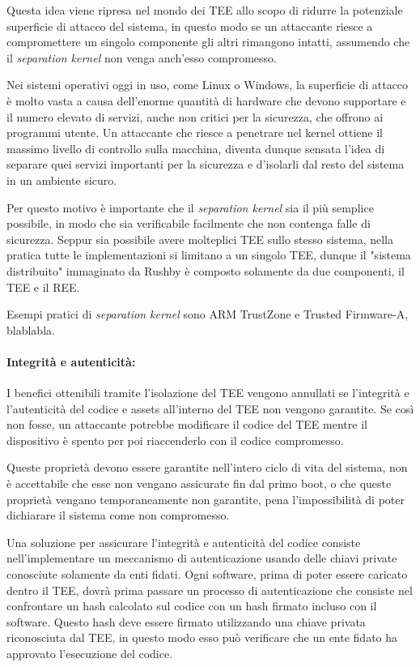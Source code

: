 \documentclass[12pt,italian]{report}
\begin{document}
Questa idea viene ripresa nel mondo dei TEE allo scopo di ridurre la
potenziale superficie di attacco del sistema, in questo modo se un
attaccante riesce a compromettere un singolo componente gli altri rimangono
intatti, assumendo che il \textit{separation kernel} non venga anch'esso
compromesso.

Nei sistemi operativi oggi in uso, come Linux o Windows, la superficie di
attacco è molto vasta a causa dell'enorme quantità di hardware che devono
supportare e il numero elevato di servizi, anche non critici per la sicurezza,
che offrono ai programmi utente.
Un attaccante che riesce a penetrare nel kernel ottiene il massimo livello di
controllo sulla macchina, diventa dunque sensata l'idea di separare quei
servizi importanti per la sicurezza e d'isolarli dal resto del sistema in
un ambiente sicuro.

Per questo motivo è importante che il \textit{separation kernel} sia
il più semplice possibile, in modo che sia verificabile facilmente che non
contenga falle di sicurezza.
Seppur sia possibile avere molteplici TEE sullo stesso sistema, nella pratica
tutte le implementazioni si limitano a un singolo TEE, dunque il
"sistema distribuito" immaginato da Rushby è composto solamente da due
componenti, il TEE e il REE.

Esempi pratici di \textit{separation kernel} sono ARM TrustZone e
Trusted Firmware-A, blablabla.

\paragraph{Integrità e autenticità:}
I benefici ottenibili tramite l'isolazione del TEE vengono annullati se
l'integrità e l'autenticità del codice e assets all'interno del TEE non
vengono garantite. Se così non fosse, un attaccante potrebbe modificare
il codice del TEE mentre il dispositivo è spento per poi riaccenderlo con
il codice compromesso.

Queste proprietà devono essere garantite nell'intero ciclo di vita del
sistema, non è accettabile che esse non vengano assicurate fin dal primo boot,
o che queste proprietà vengano temporaneamente non garantite, pena
l'impossibilità di poter dichiarare il sistema come non compromesso.

Una soluzione per assicurare l'integrità e autenticità del codice consiste
nell'implementare un meccanismo di autenticazione usando delle chiavi
private conosciute solamente da enti fidati.
Ogni software, prima di poter essere caricato dentro il TEE, dovrà prima
passare un processo di autenticazione che consiste nel confrontare un hash
calcolato sul codice con un hash firmato incluso con il software.
Questo hash deve essere firmato utilizzando una chiave privata riconosciuta
dal TEE, in questo modo esso può verificare che un ente fidato ha approvato
l'esecuzione del codice.
\end{document}
